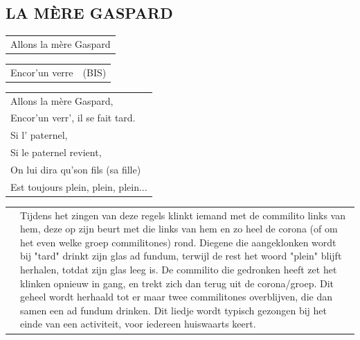 \documentclass[a4paper, 14pt]{extarticle}
\begin{document}
\subsection*{LA MÈRE GASPARD}
\begin{flushleft}
\begin{tabularx}{\textwidth} {
    >{\raggedright\arraybackslash}X}
Allons la mère Gaspard\\
\end{tabularx}
\begin{tabularx}{0.5\textwidth} {
    >{\raggedright\arraybackslash}X|c}
Encor’un verre & (BIS)\\
\end{tabularx}
\begin{tabularx}{\textwidth} {
    >{\raggedright\arraybackslash}X}
Allons la mère Gaspard,\\
Encor’un verr’, il se fait tard.\\
Si l’ paternel,\\
Si le paternel revient,\\
On lui dira qu’son fils (sa fille)\\
Est toujours plein, plein, plein...\\
\end{tabularx}
\end{flushleft}
\begin{flushleft}
\begin{tabularx}{\textwidth} {
    c >{\raggedright\arraybackslash}X}
 \hspace{5mm} & {\small Tijdens het zingen van deze regels klinkt iemand met de commilito links van hem, deze op zijn beurt met die links van hem en zo heel de corona (of om het even welke groep commilitones) rond. Diegene die aangeklonken wordt bij "tard" drinkt zijn glas ad fundum, terwijl de rest het woord "plein" blijft herhalen, totdat zijn glas leeg is. De commilito die gedronken heeft zet het klinken opnieuw in gang, en trekt zich dan terug uit de corona/groep. Dit geheel wordt herhaald tot er maar twee commilitones overblijven, die dan samen een ad fundum drinken. Dit liedje wordt typisch gezongen bij het einde van een activiteit, voor iedereen huiswaarts keert.}
\end{tabularx}
\end{flushleft}
\end{document}
